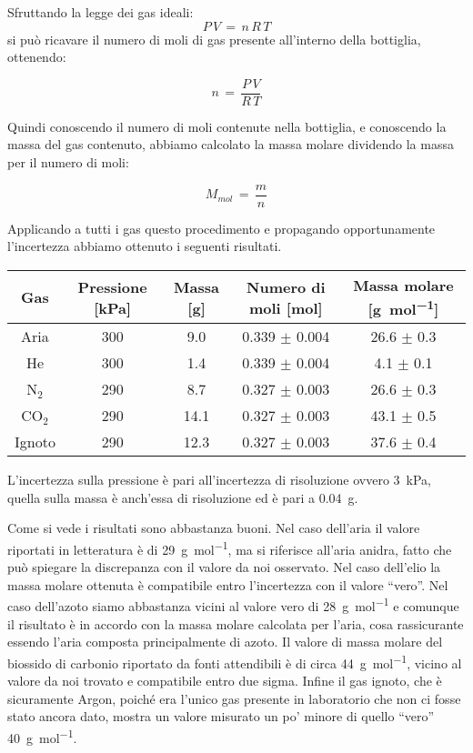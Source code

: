 Sfruttando la legge dei gas ideali:
\begin{equation}
	P\,V \,=\, n\,R\,T
\end{equation}
%
si può ricavare il numero di moli di gas presente all'interno della bottiglia, ottenendo:

\begin{equation}
	n \,=\, \frac{P\,V}{R\,T}
\end{equation}

Quindi conoscendo il numero di moli contenute nella bottiglia, e conoscendo la massa del gas contenuto,
abbiamo calcolato la massa molare dividendo la massa per il numero di moli:

\begin{equation}
	M_{mol} \,=\, \frac{m}{n}
\end{equation}

Applicando a tutti i gas questo procedimento e propagando opportunamente l'incertezza
abbiamo ottenuto i seguenti risultati. 

\begin{center}
    \begin{tabular}{c c c c c}
        \toprule
        Gas & Pressione [\si{\kilo\pascal}] & Massa [\si{\gram}] & Numero di moli [\si{\mole}] & Massa molare [\si{\gram\per\mole}] \\
        \midrule
        Aria            & 300 &  9.0 & 0.339 $\pm$ 0.004 & 26.6 $\pm$ 0.3 \\
        He              & 300 &  1.4 & 0.339 $\pm$ 0.004 &  4.1 $\pm$ 0.1 \\
        N$_2$           & 290 &  8.7 & 0.327 $\pm$ 0.003 & 26.6 $\pm$ 0.3 \\
        CO$_2$          & 290 & 14.1 & 0.327 $\pm$ 0.003 & 43.1 $\pm$ 0.5 \\
        Ignoto          & 290 & 12.3 & 0.327 $\pm$ 0.003 & 37.6 $\pm$ 0.4 \\
        \bottomrule
    \end{tabular}
\end{center}

L'incertezza sulla pressione è pari all'incertezza di risoluzione ovvero \SI{3}{\kilo\pascal}, quella sulla massa
è anch'essa di risoluzione ed è pari a \SI{0.04}{\gram}.

Come si vede i risultati sono abbastanza buoni. Nel caso dell'aria il valore riportati in letteratura è di \SI{29}{\gram\per\mole},
ma si riferisce all'aria anidra, fatto che può spiegare la discrepanza con il valore da noi osservato. Nel caso dell'elio
la massa molare ottenuta è compatibile entro l'incertezza con il valore ``vero''. Nel caso dell'azoto siamo
abbastanza vicini al valore vero di \SI{28}{\gram\per\mole} e comunque il risultato è in accordo con la massa molare calcolata per l'aria,
cosa rassicurante essendo l'aria composta principalmente di azoto. Il valore di massa molare del biossido di carbonio
riportato da fonti attendibili è di circa \SI{44}{\gram\per\mole}, vicino al valore da noi trovato e compatibile entro due sigma.
Infine il gas ignoto, che è sicuramente Argon, poiché era l'unico gas presente in laboratorio che non ci fosse stato
ancora dato, mostra un valore misurato un po' minore di quello ``vero'' \SI{40}{\gram\per\mole}.

